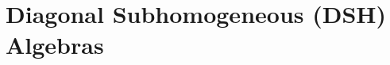 \documentclass[12pt]{amsart}
\numberwithin{equation}{section}
\theoremstyle{definition}
\theoremstyle{remark}
\newtheorem*{ack*}{Acknowledgements}
\newcommand{\NN}{\mathbb{N}}
\begin{document}












\section{Diagonal Subhomogeneous (DSH) Algebras}
\label{ch: DSH}
\end{document}
